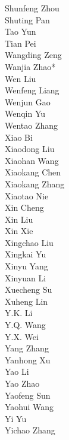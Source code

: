 \documentclass[11pt, a4paper, logo, copyright, nonumbering]{deepseek}
\begin{document}
\begin{CJK*}{UTF8}{gbsn}
\begin{multicols}{2}
\color{damaiblue} Shunfeng Zhou \\
\color{damaiblue} Shuting Pan \\
\color{damaiblue} Tao Yun \\
\color{damaiblue} Tian Pei \\
\color{damaiblue} Wangding Zeng \\
\color{damaiblue} Wanjia Zhao* \\
\color{damaiblue} Wen Liu \\
\color{damaiblue} Wenfeng Liang \\
\color{damaiblue} Wenjun Gao \\
\color{damaiblue} Wenqin Yu \\
\color{damaiblue} Wentao Zhang \\
\color{damaiblue} Xiao Bi \\
\color{damaiblue} Xiaodong Liu \\
\color{damaiblue} Xiaohan Wang \\
\color{damaiblue} Xiaokang Chen \\
\color{damaiblue} Xiaokang Zhang \\
\color{damaiblue} Xiaotao Nie \\
\color{damaiblue} Xin Cheng \\
\color{damaiblue} Xin Liu \\
\color{damaiblue} Xin Xie \\
\color{damaiblue} Xingchao Liu \\
\color{damaiblue} Xingkai Yu \\
\color{damaiblue} Xinyu Yang \\
\color{damaiblue} Xinyuan Li \\
\color{damaiblue} Xuecheng Su \\
\color{damaiblue} Xuheng Lin \\
\color{damaiblue} Y.K. Li \\
\color{damaiblue} Y.Q. Wang \\
\color{damaiblue} Y.X. Wei \\
\color{damaiblue} Yang Zhang \\
\color{damaiblue} Yanhong Xu \\
\color{damaiblue} Yao Li \\
\color{damaiblue} Yao Zhao \\
\color{damaiblue} Yaofeng Sun \\
\color{damaiblue} Yaohui Wang \\
\color{damaiblue} Yi Yu \\
\color{damaiblue} Yichao Zhang \\

\end{multicols}
\end{CJK*}
\end{document}
